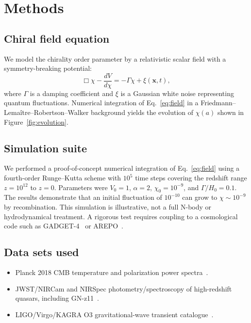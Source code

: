 \documentclass[a4paper,11pt]{article}
\begin{document}
\section{Methods}
\label{sec:methods}

\subsection{Chiral field equation}

We model the chirality order parameter by a relativistic scalar field with a symmetry-breaking potential:
\begin{equation}
    \Box \chi - \frac{dV}{d\chi} = -\Gamma \dot{\chi} + \xi(\mathbf{x},t),
    \label{eq:field}
\end{equation}
where $\Gamma$ is a damping coefficient and $\xi$ is a Gaussian white noise representing quantum fluctuations. Numerical integration of Eq.~\eqref{eq:field} in a Friedmann--Lema\^itre--Robertson--Walker background yields the evolution of $\chi(a)$ shown in Figure~\ref{fig:evolution}.

\subsection{Simulation suite}

We performed a proof-of-concept numerical integration of Eq.~\eqref{eq:field} using a fourth-order Runge--Kutta scheme with $10^5$ time steps covering the redshift range $z=10^{12}$ to $z=0$. Parameters were $V_0 = 1$, $\alpha = 2$, $\chi_0 = 10^{-9}$, and $\Gamma/H_0 = 0.1$. The results demonstrate that an initial fluctuation of $10^{-10}$ can grow to $\chi \sim 10^{-9}$ by recombination. This simulation is illustrative, not a full N-body or hydrodynamical treatment. A rigorous test requires coupling to a cosmological code such as \textsc{GADGET-4}~\cite{Springel2021} or \textsc{AREPO}~\cite{Weinberger2020}.

\subsection{Data sets used}

\begin{itemize}
    \item Planck 2018 CMB temperature and polarization power spectra~\cite{Planck2018}.
    \item JWST/NIRCam and NIRSpec photometry/spectroscopy of high-redshift quasars, including GN-z11~\cite{Johnson2024}.
    \item LIGO/Virgo/KAGRA O3 gravitational-wave transient catalogue~\cite{Abbott2023}.
\end{itemize}
\end{document}
